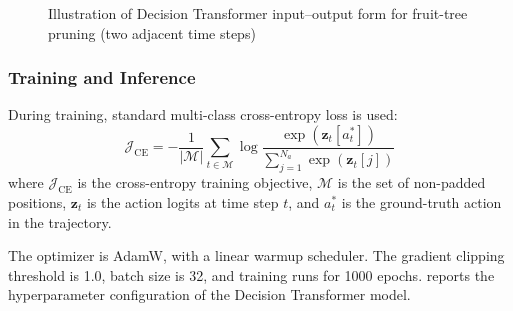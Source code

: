 \documentclass[12pt,a4paper,fontset=fandol]{ctexart}
\begin{document}
\begin{figure}[htbp]
{%
}
\caption{Illustration of Decision Transformer input--output form for fruit-tree pruning (two adjacent time steps)}
\label{fig:dt_arch}
\end{figure}

\subsubsection{Training and Inference}

During training, standard multi-class cross-entropy loss is used:
\begin{equation}\label{eq:dt_loss}
  \mathcal{J}_{\mathrm{CE}} = -\frac{1}{|\mathcal{M}|} \sum_{t \in \mathcal{M}}
    \log \frac{\exp(\mathbf{z}_t[a_t^*])}{\sum_{j=1}^{N_a} \exp(\mathbf{z}_t[j])}
\end{equation}
where $\mathcal{J}_{\mathrm{CE}}$ is the cross-entropy training objective, $\mathcal{M}$ is the set of non-padded positions, $\mathbf{z}_t$ is the action logits at time step $t$,
and $a_t^*$ is the ground-truth action in the trajectory.

The optimizer is AdamW,
with a linear warmup scheduler.
The gradient clipping threshold is 1.0, batch size is 32, and training runs for 1000 epochs.
 reports the hyperparameter configuration of the Decision Transformer model.
\end{document}
